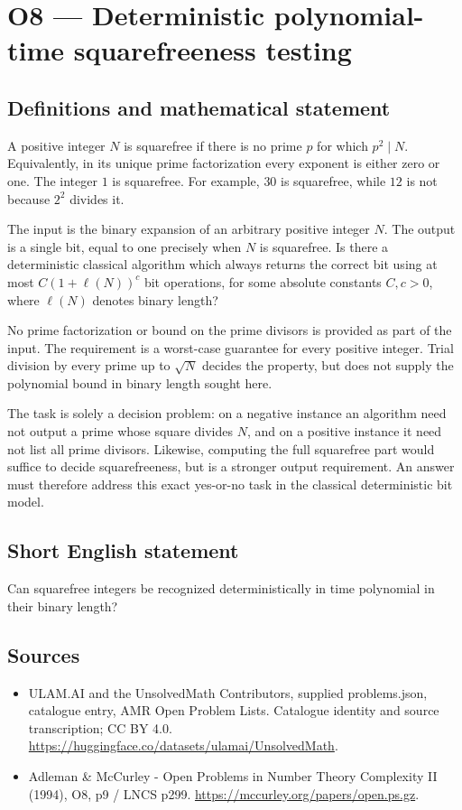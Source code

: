\documentclass[11pt,a4paper]{article}
\begin{document}
\section*{O8 — Deterministic polynomial-time squarefreeness testing}\label{statement}

\subsection{Definitions and mathematical statement}
A positive integer $N$ is squarefree if there is no prime $p$ for which $p^2\mid N$. Equivalently, in its unique prime factorization every exponent is either zero or one. The integer $1$ is squarefree. For example, $30$ is squarefree, while $12$ is not because $2^2$ divides it.

The input is the binary expansion of an arbitrary positive integer $N$. The output is a single bit, equal to one precisely when $N$ is squarefree. Is there a deterministic classical algorithm which always returns the correct bit using at most $C(1+\ell(N))^c$ bit operations, for some absolute constants $C,c>0$, where $\ell(N)$ denotes binary length?

No prime factorization or bound on the prime divisors is provided as part of the input. The requirement is a worst-case guarantee for every positive integer. Trial division by every prime up to $\sqrt N$ decides the property, but does not supply the polynomial bound in binary length sought here.

The task is solely a decision problem: on a negative instance an algorithm need not output a prime whose square divides $N$, and on a positive instance it need not list all prime divisors. Likewise, computing the full squarefree part would suffice to decide squarefreeness, but is a stronger output requirement. An answer must therefore address this exact yes-or-no task in the classical deterministic bit model.
\subsection{Short English statement}
Can squarefree integers be recognized deterministically in time polynomial in their binary length?
\subsection{Sources}
\begin{itemize}
\item[S1] ULAM.AI and the UnsolvedMath Contributors, supplied problems.json, catalogue entry, AMR Open Problem Lists. Catalogue identity and source transcription; CC BY 4.0.
\url{https://huggingface.co/datasets/ulamai/UnsolvedMath}.
\item[S2] Adleman \& McCurley - Open Problems in Number Theory Complexity II (1994), O8, p9 / LNCS p299. 
\url{https://mccurley.org/papers/open.ps.gz}.
\end{itemize}
\end{document}
